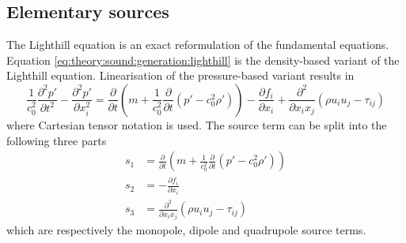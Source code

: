 




\subsection{Elementary sources}
The Lighthill equation is an exact reformulation of the fundamental equations.
Equation \eqref{eq:theory:sound:generation:lighthill} is the density-based variant of the Lighthill equation.
Linearisation of the pressure-based variant results in
\begin{equation}
 \frac{1}{c_0^2}\frac{\partial^2 p'}{\partial t^2} - \frac{\partial^2 p'}{\partial x_i^2} = \frac{\partial}{\partial t} \left( m + \frac{1}{c_0^2}\frac{\partial}{\partial t}\left(p' - c_0^2 \rho' \right) \right) - \frac{\partial f_i}{\partial x_i} + \frac{\partial^2 }{\partial x_i x_j} \left( \rho u_i u_j - \tau_{ij} \right)
\end{equation}
where Cartesian tensor notation is used.
The source term can be split into the following three parts
\begin{align}
  s_1 &= \frac{\partial}{\partial t} \left( m + \frac{1}{c_0^2}\frac{\partial}{\partial t}\left(p' - c_0^2 \rho' \right) \right) \\
  s_2 &= - \frac{\partial f_i}{\partial x_i} \\
  s_3 &= \frac{\partial^2 }{\partial x_i x_j} \left( \rho u_i u_j - \tau_{ij} \right)
\end{align}
which are respectively the monopole, dipole and quadrupole source terms.


